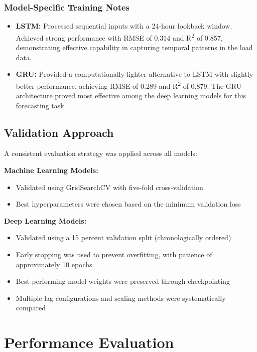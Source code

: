 \documentclass[oneside, 12pt]{book}
\numberwithin{equation}{chapter}
\newcommand{\sizexii}{\fontsize{12pt}{6pt}\selectfont}
\begin{document}
\subsubsection{Model-Specific Training Notes}

\begin{itemize}
    \item \textbf{LSTM:} Processed sequential inputs with a 24-hour lookback window. Achieved strong performance with RMSE of 0.314 and R\textsuperscript{2} of 0.857, demonstrating effective capability in capturing temporal patterns in the load data.
    \item \textbf{GRU:} Provided a computationally lighter alternative to LSTM with slightly better performance, achieving RMSE of 0.289 and R\textsuperscript{2} of 0.879. The GRU architecture proved most effective among the deep learning models for this forecasting task.
\end{itemize}

\subsection{\sizexii Validation Approach}

A consistent evaluation strategy was applied across all models:

\textbf{Machine Learning Models:}
\begin{itemize}
    \item Validated using GridSearchCV with five-fold cross-validation
    \item Best hyperparameters were chosen based on the minimum validation loss
\end{itemize}

\textbf{Deep Learning Models:}
\begin{itemize}
    \item Validated using a 15 percent validation split (chronologically ordered)
    \item Early stopping was used to prevent overfitting, with patience of approximately 10 epochs
    \item Best-performing model weights were preserved through checkpointing
    \item Multiple lag configurations and scaling methods were systematically compared
\end{itemize}

\section{\sizexii Performance Evaluation}
\end{document}
